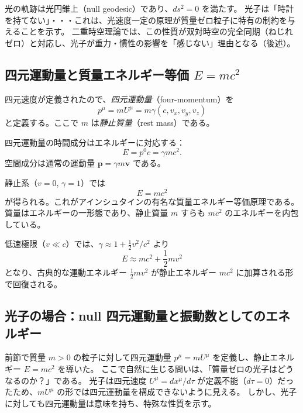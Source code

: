 \documentclass[dvipdfmx,a4paper]{jsbook}
\theoremstyle{definition}
\theoremstyle{remark}
\begin{document}
光の軌跡は光円錐上（null geodesic）であり、$ds^2 = 0$ を満たす。  
光子は「時計を持てない」・・・これは、光速度一定の原理が質量ゼロ粒子に特有の制約を与えることを示す。  
二重時空理論では、この性質が双対時空の完全同期（ねじれゼロ）と対応し、光子が重力・慣性の影響を「感じない」理由となる（後述）。

\subsection{四元運動量と質量エネルギー等価 $E=mc^2$}

四元速度が定義されたので、\emph{四元運動量}（four-momentum）を
\begin{equation}
  p^\mu = m U^\mu = m \gamma \left(c, v_x, v_y, v_z\right)
  \label{eq:four-momentum}
\end{equation}
と定義する。ここで $m$ は\emph{静止質量}（rest mass）である。

四元運動量の時間成分はエネルギーに対応する：
\begin{equation}
  E = p^0 c = \gamma m c^2.
\end{equation}
空間成分は通常の運動量 $\mathbf{p} = \gamma m \mathbf{v}$ である。

静止系（$v=0$, $\gamma=1$）では
\begin{equation}
  E = m c^2
  \label{eq:emc2}
\end{equation}
が得られる。これがアインシュタインの有名な質量エネルギー等価原理である。  
質量はエネルギーの一形態であり、静止質量 $m$ すらも $m c^2$ のエネルギーを内包している。

低速極限（$v \ll c$）では、$\gamma \approx 1 + \frac{1}{2} v^2/c^2$ より
\begin{equation}
  E \approx m c^2 + \frac{1}{2} m v^2
\end{equation}
となり、古典的な運動エネルギー $\frac{1}{2} m v^2$ が静止エネルギー $m c^2$ に加算される形で回復される。

\subsection{光子の場合：null 四元運動量と振動数としてのエネルギー}
\label{subsec:photon-four-momentum}

前節で質量 $m > 0$ の粒子に対して四元運動量 $p^\mu = m U^\mu$ を定義し、静止エネルギー $E = m c^2$ を導いた。  
ここで自然に生じる問いは、「質量ゼロの光子はどうなるのか？」である。  
光子は四元速度 $U^\mu = dx^\mu / d\tau$ が定義不能（$d\tau = 0$）だったため、$m U^\mu$ の形では四元運動量を構成できないように見える。  
しかし、光子に対しても四元運動量は意味を持ち、特殊な性質を示す。
\end{document}
